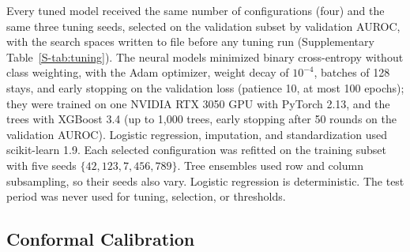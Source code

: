 Every tuned model received the same number of configurations (four) and the same three tuning seeds, selected on the validation subset by validation
AUROC, with the search spaces written to file before any tuning run (Supplementary Table~\ref{S-tab:tuning}).
The neural models minimized binary cross-entropy without class weighting, with the Adam optimizer, weight decay of $10^{-4}$, batches of 128 stays, and early stopping on the validation loss (patience 10, at most 100 epochs); they were trained on one NVIDIA RTX 3050 GPU with PyTorch 2.13, and the trees with XGBoost 3.4 (up to 1,000 trees, early stopping after 50 rounds on the validation AUROC). Logistic regression, imputation, and standardization used scikit-learn 1.9. Each selected configuration was refitted on the training subset with five seeds $\{42, 123, 7, 456, 789\}$. Tree ensembles used row and column subsampling, so their
seeds also vary. Logistic regression is deterministic. The test period was never used for tuning, selection, or thresholds.

\subsection{Conformal Calibration}
\label{sec:methods-conformal}

